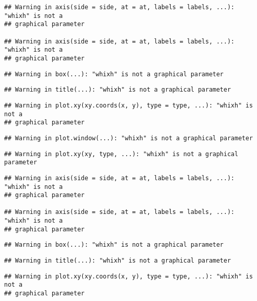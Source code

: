 \documentclass[
]{article}
\begin{document}
\begin{verbatim}
## Warning in axis(side = side, at = at, labels = labels, ...): "whixh" is not a
## graphical parameter

## Warning in axis(side = side, at = at, labels = labels, ...): "whixh" is not a
## graphical parameter
\end{verbatim}

\begin{verbatim}
## Warning in box(...): "whixh" is not a graphical parameter
\end{verbatim}

\begin{verbatim}
## Warning in title(...): "whixh" is not a graphical parameter
\end{verbatim}

\begin{verbatim}
## Warning in plot.xy(xy.coords(x, y), type = type, ...): "whixh" is not a
## graphical parameter
\end{verbatim}

\begin{verbatim}
## Warning in plot.window(...): "whixh" is not a graphical parameter
\end{verbatim}

\begin{verbatim}
## Warning in plot.xy(xy, type, ...): "whixh" is not a graphical parameter
\end{verbatim}

\begin{verbatim}
## Warning in axis(side = side, at = at, labels = labels, ...): "whixh" is not a
## graphical parameter

## Warning in axis(side = side, at = at, labels = labels, ...): "whixh" is not a
## graphical parameter
\end{verbatim}

\begin{verbatim}
## Warning in box(...): "whixh" is not a graphical parameter
\end{verbatim}

\begin{verbatim}
## Warning in title(...): "whixh" is not a graphical parameter
\end{verbatim}

\begin{verbatim}
## Warning in plot.xy(xy.coords(x, y), type = type, ...): "whixh" is not a
## graphical parameter
\end{verbatim}
\end{document}

